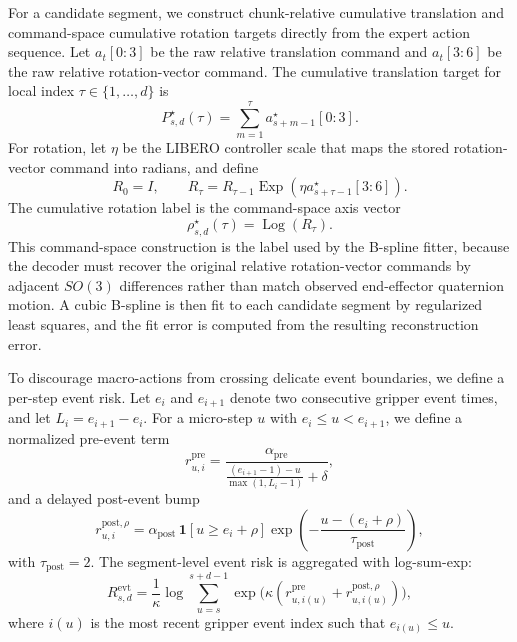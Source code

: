 \documentclass[10pt,twocolumn,letterpaper]{article}
\begin{document}
For a candidate segment, we construct chunk-relative cumulative translation and command-space cumulative rotation targets directly from the expert action sequence. Let $a_t[0\!:\!3]$ be the raw relative translation command and $a_t[3\!:\!6]$ be the raw relative rotation-vector command. The cumulative translation target for local index $\tau\in\{1,\dots,d\}$ is
\begin{equation}
P^{\star}_{s,d}(\tau)=\sum_{m=1}^{\tau}a^{\star}_{s+m-1}[0\!:\!3].
\end{equation}
For rotation, let $\eta$ be the LIBERO controller scale that maps the stored rotation-vector command into radians, and define
\begin{equation}
R_0=I,
\qquad
R_{\tau}=R_{\tau-1}\operatorname{Exp}\!\left(\eta a^{\star}_{s+\tau-1}[3\!:\!6]\right).
\end{equation}
The cumulative rotation label is the command-space axis vector
\begin{equation}
\rho^{\star}_{s,d}(\tau)=\operatorname{Log}(R_{\tau}).
\end{equation}
This command-space construction is the label used by the B-spline fitter, because the decoder must recover the original relative rotation-vector commands by adjacent $SO(3)$ differences rather than match observed end-effector quaternion motion. A cubic B-spline is then fit to each candidate segment by regularized least squares, and the fit error is computed from the resulting reconstruction error.

To discourage macro-actions from crossing delicate event boundaries, we define a per-step event risk. Let $e_i$ and $e_{i+1}$ denote two consecutive gripper event times, and let $L_i=e_{i+1}-e_i$. For a micro-step $u$ with $e_i\le u < e_{i+1}$, we define a normalized pre-event term
\begin{equation}
r^{\mathrm{pre}}_{u,i} =
\frac{\alpha_{\mathrm{pre}}}
{\frac{(e_{i+1}-1)-u}{\max(1,L_i-1)}+\delta},
\end{equation}
and a delayed post-event bump
\begin{equation}
r^{\mathrm{post},\rho}_{u,i} =
\alpha_{\mathrm{post}}\,\mathbf{1}[u\ge e_i+\rho]
\exp\!\left(-\frac{u-(e_i+\rho)}{\tau_{\mathrm{post}}}\right),
\end{equation}
with $\tau_{\mathrm{post}}=2$. The segment-level event risk is aggregated with log-sum-exp:
\begin{equation}
R^{\mathrm{evt}}_{s,d} = \frac{1}{\kappa}
\log\sum_{u=s}^{s+d-1}\exp\bigl(\kappa(r^{\mathrm{pre}}_{u,i(u)}+r^{\mathrm{post},\rho}_{u,i(u)})\bigr),
\end{equation}
where $i(u)$ is the most recent gripper event index such that $e_{i(u)}\le u$.
\end{document}
